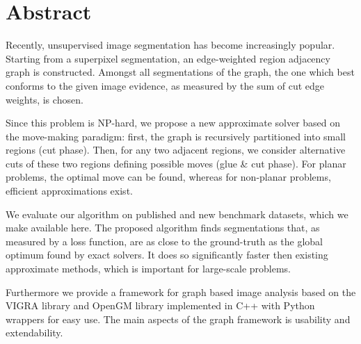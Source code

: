 
\begingroup
\let\clearpage\relax
\let\cleardoublepage\relax
\let\cleardoublepage\relax

\chapter*{Abstract} %

Recently, unsupervised image segmentation has become increasingly
popular.
Starting from a superpixel segmentation, an edge-weighted region
adjacency graph is constructed. Amongst all
segmentations of the graph,
the one which best conforms to the given image
evidence, as measured by the sum of cut edge weights,
is chosen.

Since this problem is NP-hard, we propose 
a new approximate solver based on the move-making paradigm:
first, the graph is recursively partitioned into
small regions (cut phase).
%
Then, for any two adjacent 
regions, we consider alternative cuts of these two regions
defining possible moves (glue \& cut phase).
%
For planar problems, the optimal move can be found, whereas
for non-planar problems, efficient approximations exist. 

We evaluate our algorithm on published and
new benchmark datasets, which we make available here.
%
The proposed algorithm finds segmentations that,
as measured by a loss function, are as close to
the ground-truth as the global optimum found by exact solvers.
%
It does so significantly faster then existing approximate methods,
which is important for large-scale problems.

Furthermore we provide a framework for graph based image analysis based
on the VIGRA library and OpenGM library implemented in C++ with Python wrappers
for easy use.
The main aspects of the graph framework is usability and extendability.


\endgroup			

\vfill